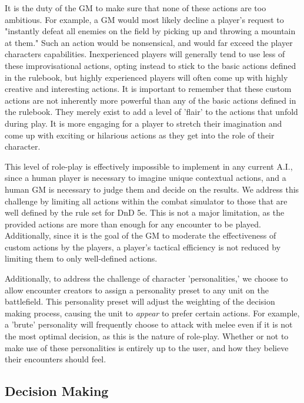 \documentclass[12pt,a4paper]{report}
\begin{document}
		It is the duty of the GM to make sure that none of these actions are too ambitious. For example, a GM would most likely decline a player's request to "instantly defeat all enemies on the field by picking up and throwing a mountain at them." Such an action would be nonsensical, and would far exceed the player characters capabilities. Inexperienced players will generally tend to use less of these improvisational actions, opting instead to stick to the basic actions defined in the rulebook, but highly experienced players will often come up with highly creative and interesting actions. It is important to remember that these custom actions are not inherently more powerful than any of the basic actions defined in the rulebook. They merely exist to add a level of 'flair' to the actions that unfold during play. It is more engaging for a player to stretch their imagination and come up with exciting or hilarious actions as they get into the role of their character. 
		
		This level of role-play is effectively impossible to implement in any current A.I., since a human player is necessary to imagine unique contextual actions, and a human GM is necessary to judge them and decide on the results. We address this challenge by limiting all actions within the combat simulator to those that are well defined by the rule set for DnD 5e. This is not a major limitation, as the provided actions are more than enough for any encounter to be played. Additionally, since it is the goal of the GM to moderate the effectiveness of custom actions by the players, a player's tactical efficiency is not reduced by limiting them to only well-defined actions. 
		
		Additionally, to address the challenge of character 'personalities,' we choose to allow encounter creators to assign a personality preset to any unit on the battlefield. This personality preset will adjust the weighting of the decision making process, causing the unit to \textit{appear} to prefer certain actions. For example, a 'brute' personality will frequently choose to attack with melee even if it is not the most optimal decision, as this is the nature of role-play. Whether or not to make use of these personalities is entirely up to the user, and how they believe their encounters should feel. 
		
		
		\subsection{Decision Making}
		
\end{document}

